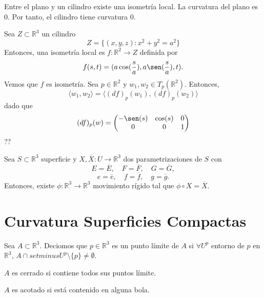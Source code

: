 \begin{obs}
  Entre el plano y un cilindro existe una isometría local. La curvatura del plano es $0$. Por tanto, el cilindro tiene curvatura $0$.
\end{obs}

\begin{ejm}
  Sea $Z \subset \mathbb{R}^{3}$ un cilindro
  \[ 
    Z = \{ (x,y,z) : x^{2} + y^{2} = a^{2} \} 
  \] 
  Entonces, una isometría local es $f : \mathbb{R}^{2} \to Z$ definida por
  \[
    f(s,t) = (a \cos(\frac{s}{a}), a \sen(\frac{s}{a}), t).
  \] 
  Vemos que $f$ es isometría. Sea $p \in \mathbb{R}^{2}$ y $w_{1}, w_{2} \in T_{p}(\mathbb{R}^{2})$. Entonces,
  \[ 
    \langle w_{1}{ , }w_{2} \rangle = \langle (d f)_{p}(w_{1}){ , }(d f)_{p}(w_{2}) \rangle
  \] 
  dado que
  \[ 
    (d f)_{p}(w) =
    \begin{pmatrix}
      -\sen(s) & \cos(s) & 0 \\
      0 & 0 & 1
    \end{pmatrix} 
  \] ??
\end{ejm}

\begin{theo}[Bonnet]
  Sea $S \subset \mathbb{R}^{3}$ superficie y $X, \overline{X} : U \to \mathbb{R}^{3}$ dos parametrizaciones de $S$ con 
  \[  
    E = \overline{E}, \quad F = \overline{F}, \quad G = \overline{G},
  \] 
  \[ 
    e = \overline{e}, \quad f = \overline{f} , \quad g = \overline{g}.
  \] 
  Entonces, existe $\phi : \mathbb{R}^{3} \to \mathbb{R}^{3}$ movimiento rígido tal que $\phi \circ X = \overline{X}$.
\end{theo}

\section{Curvatura Superficies Compactas}

\begin{defn}
  Sea $A \subset \mathbb{R}^{3}$. Deciomos que $p \in \mathbb{R}^{3}$ es un punto límite de $A$ si $\forall U^{p}$ entorno de $p$ en $ \mathbb{R}^{3}$, $A \cap setminus U^{p} \setminus \{ p \} \neq \emptyset$.
\end{defn}

\begin{defn}
  $A$ es cerrado si contiene todos sus puntos límite.
\end{defn}

\begin{defn}
  $A$ es acotado si está contenido en alguna bola.
\end{defn}

